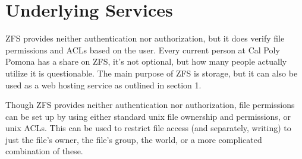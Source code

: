 \section{Underlying Services}

ZFS provides neither authentication nor authorization, but it does verify file permissions and ACLs based on the user. Every current person at Cal Poly Pomona has a share on ZFS, it's not optional, but how many people actually utilize it is questionable. The main purpose of ZFS is storage, but it can also be used as a web hosting service as outlined in section 1.

Though ZFS provides neither authentication nor authorization, file permissions can be set up by using either standard unix file ownership and permissions, or unix ACLs. This can be used to restrict file access (and separately, writing) to just the file's owner, the file's group, the world, or a more complicated combination of these.
